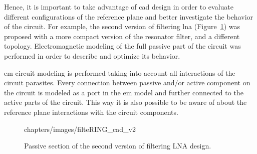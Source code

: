 


Hence, it is important to take advantage of \gls{cad} design in order to evaluate different configurations of the reference plane and better investigate the behavior of the circuit. For example, the second version of filtering \gls{lna} (Figure~\ref{fig_filtering_lna_cad}) was proposed with a more compact version of the resonator filter, and a different topology. Electromagnetic modeling of the full passive part of the circuit was performed in order to describe and optimize its behavior.


\gls{em} circuit modeling is performed taking into account all interactions of the circuit parasites. Every connection between passive and/or active component on the circuit is modeled as a \momentum port in the \gls{em} model and further connected to the active parts of the circuit. This way it is also possible to be aware of about the reference plane interactions with the circuit components.

\begin{figure}[!hbt]
\centering
	\begin{overpic}[scale=1]{chapters/images/filteRING_cad_v2}
	\end{overpic}
\caption{Passive section of the second version of filtering LNA design.}
\label{fig_filtering_lna_cad}
\end{figure}

